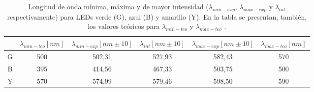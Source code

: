 \documentclass[%
 reprint,
 amsmath,amssymb,
 aps,
]{revtex4-1}
\begin{document}
\begin{table}[H]
\centering
  \caption{Longitud de onda mínima, máxima y de mayor intensidad ($\lambda_{min-exp}$, $\lambda_{max-exp}$ y $\lambda_{int}$ respectivamente) para LEDs verde (G), azul (B) y amarillo (Y). En la tabla se presentan, también, los valores teóricos para $\lambda_{min-teo}$ y $\lambda_{max-teo}$ \cite{LEDs_lambda}.}
  \begin{adjustbox}{width=8.5cm}
\begin{tabular}{|c|c|c|c|c|c|}
\hline
$ $        & $\lambda_{min-teo}[nm]$ & $\lambda_{min-exp}[nm \pm 10]$ & $\lambda_{int}[nm \pm 10]$ & $\lambda_{max-exp}[nm \pm 10]$ & $\lambda_{max-teo}[nm]$ \\ \hline
G    & 500            & 502,31     & 527,93     & 582,43     & 570            \\ \hline
B     & 395      & 414,56     & 467,33     & 503,75     & 500            \\ \hline
Y & 570            & 574,99     & 579,46     & 598,50     & 590            \\ \hline
\end{tabular}
\label{tableds}
 \end{adjustbox}
\end{table}
\end{document}
